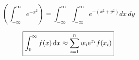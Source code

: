 
$$\left(\int_{-\infty}^{\infty} e^{-x^2}\right) =\int_{-\infty}^{\infty}\int_{-\infty}^{\infty}e^{-(x^2+y^2)}dx \, dy $$

\begin{equation}
	 \fbox{$\displaystyle\int_0^\infty f(x)\,{\rm d}x 
	\approx\sum_{i=1}^nw_i{\rm e}^{x_i}f(x_i)$} 
\end{equation}
